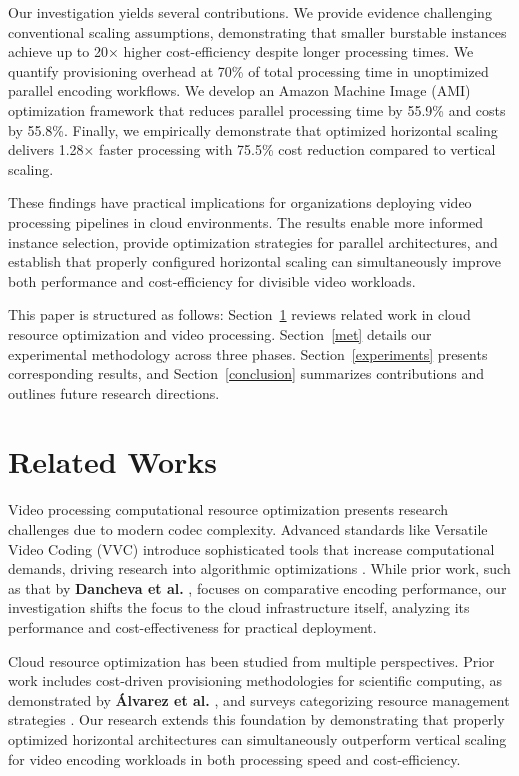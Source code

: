 \documentclass[conference]{IEEEtran}
\begin{document}
	Our investigation yields several contributions. We provide evidence challenging conventional scaling assumptions, demonstrating that smaller burstable instances achieve up to 20× higher cost-efficiency despite longer processing times. We quantify provisioning overhead at 70\% of total processing time in unoptimized parallel encoding workflows. We develop an Amazon Machine Image (AMI) optimization framework that reduces parallel processing time by 55.9\% and costs by 55.8\%. Finally, we empirically demonstrate that optimized horizontal scaling delivers 1.28× faster processing with 75.5\% cost reduction compared to vertical scaling.
	
	These findings have practical implications for organizations deploying video processing pipelines in cloud environments. The results enable more informed instance selection, provide optimization strategies for parallel architectures, and establish that properly configured horizontal scaling can simultaneously improve both performance and cost-efficiency for divisible video workloads.
	
	This paper is structured as follows: Section~\ref{rel_works} reviews related work in cloud resource optimization and video processing. Section~\ref{met} details our experimental methodology across three phases. Section~\ref{experiments} presents corresponding results, and Section~\ref{conclusion} summarizes contributions and outlines future research directions.
	
	\section{Related Works}
	\label{rel_works}
	
	Video processing computational resource optimization presents research challenges due to modern codec complexity. Advanced standards like Versatile Video Coding (VVC) introduce sophisticated tools that increase computational demands, driving research into algorithmic optimizations \cite{b15, b16}. While prior work, such as that by \textbf{Dancheva et al.} \cite{b3}, focuses on comparative encoding performance, our investigation shifts the focus to the cloud infrastructure itself, analyzing its performance and cost-effectiveness for practical deployment.
	
	Cloud resource optimization has been studied from multiple perspectives. Prior work includes cost-driven provisioning methodologies for scientific computing, as demonstrated by \textbf{Álvarez et al.} \cite{b2}, and surveys categorizing resource management strategies \cite{b4}. Our research extends this foundation by demonstrating that properly optimized horizontal architectures can simultaneously outperform vertical scaling for video encoding workloads in both processing speed and cost-efficiency.
	
\end{document}
